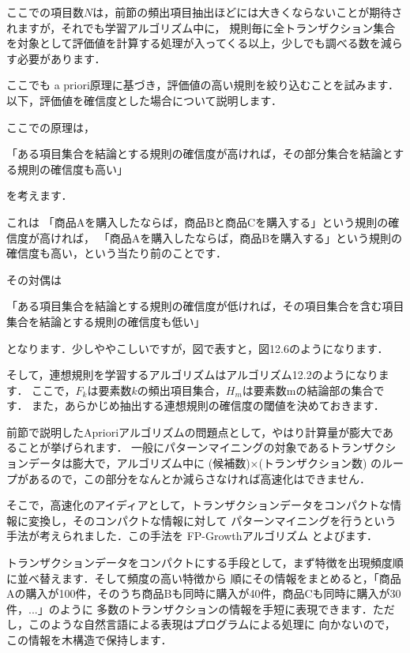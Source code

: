 
ここでの項目数$N$は，前節の頻出項目抽出ほどには大きくならないことが期待されますが，それでも学習アルゴリズム中に，
規則毎に全トランザクション集合を対象として評価値を計算する処理が入ってくる以上，少しでも調べる数を減らす必要があります．


ここでも a priori原理に基づき，評価値の高い規則を絞り込むことを試みます．以下，評価値を確信度とした場合について説明します．

ここでの原理は，

「ある項目集合を結論とする規則の確信度が高ければ，その部分集合を結論とする規則の確信度も高い」

を考えます．

これは
「商品Aを購入したならば，商品Bと商品Cを購入する」という規則の確信度が高ければ，
「商品Aを購入したならば，商品Bを購入する」という規則の確信度も高い，という当たり前のことです．

その対偶は

「ある項目集合を結論とする規則の確信度が低ければ，その項目集合を含む項目集合を結論とする規則の確信度も低い」

となります．少しややこしいですが，図で表すと，図12.6のようになります．



そして，連想規則を学習するアルゴリズムはアルゴリズム12.2のようになります．
ここで，$F_k$は要素数$k$の頻出項目集合，$H_m$は要素数mの結論部の集合です．
また，あらかじめ抽出する連想規則の確信度の閾値を決めておきます．






前節で説明したAprioriアルゴリズムの問題点として，やはり計算量が膨大であることが挙げられます．
一般にパターンマイニングの対象であるトランザクションデータは膨大で，アルゴリズム中に
(候補数)×(トランザクション数) のループがあるので，この部分をなんとか減らさなければ高速化はできません．

そこで，高速化のアイディアとして，トランザクションデータをコンパクトな情報に変換し，そのコンパクトな情報に対して
パターンマイニングを行うという手法が考えられました．この手法を
FP-Growthアルゴリズム
とよびます．

トランザクションデータをコンパクトにする手段として，まず特徴を出現頻度順に並べ替えます．そして頻度の高い特徴から
順にその情報をまとめると，「商品Aの購入が100件，そのうち商品Bも同時に購入が40件，商品Cも同時に購入が30件，...」のように
多数のトランザクションの情報を手短に表現できます．ただし，このような自然言語による表現はプログラムによる処理に
向かないので，この情報を木構造で保持します．

